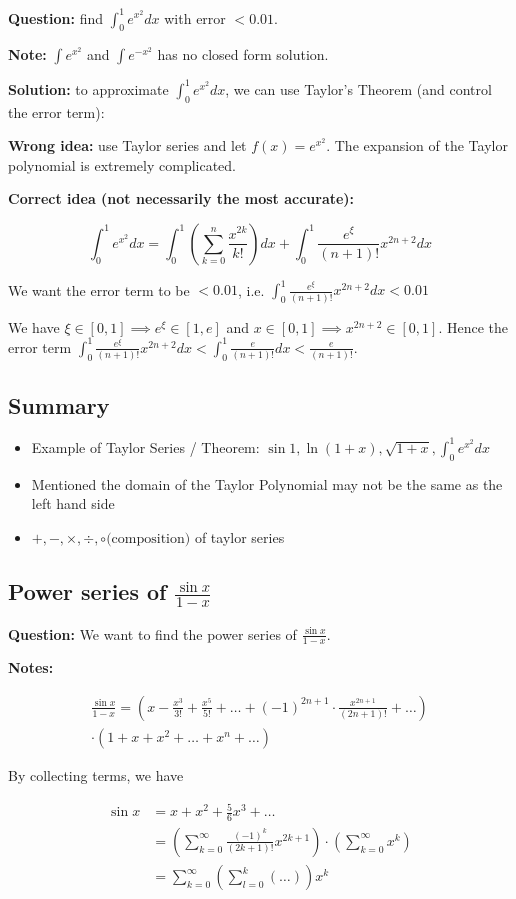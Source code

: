 \textbf{Question:} find $\int_0^1 e^{x^2} dx$ with error $< 0.01$.

\textbf{Note:} $\int e^{x^2}$ and $\int e^{-x^2}$ has no closed form solution.

\textbf{Solution:} to approximate $ \int_0^1 e^{x^2} dx $, we can use Taylor's Theorem (and control the error term):

\textbf{Wrong idea:} use Taylor series and let $f(x) = e^{x^2}$. The expansion of the Taylor polynomial is extremely complicated.

\textbf{Correct idea (not necessarily the most accurate):}

$$ \int_0^1 e^{x^2} dx = \int_0^1 (\sum_{k=0}^n \frac{x^{2k}}{k!}) dx + \int_0^1 \frac{e^\xi}{(n+1)!} x^{2n+2} dx $$

We want the error term to be $< 0.01$, i.e. $ \int_{0}^1 \frac{e^\xi}{(n+1)!} x^{2n+2} dx < 0.01 $

We have $ \xi \in [0, 1] \implies e^\xi \in [1, e] $ and $ x \in [0, 1] \implies x^{2n+2} \in [0, 1] $. Hence the error term $ \int_{0}^1 \frac{e^\xi}{(n+1)!} x^{2n+2} dx < \int_0^1 \frac{e}{(n+1)!} dx < \frac{e}{(n+1)!} $.

\subsection{Summary}

\begin{itemize}
  \item Example of Taylor Series / Theorem: $\sin 1, \ln (1 + x), \sqrt{1 + x}, \int_0^1 e^{x^2} dx$
  \item Mentioned the domain of the Taylor Polynomial may not be the same as the left hand side
  \item $+, -, \times, \div, \circ \text{(composition)}$ of taylor series
\end{itemize}

\subsection{Power series of $ \frac{\sin x}{1 - x} $}

\textbf{Question:} We want to find the power series of $ \frac{\sin x}{1 - x} $.

\textbf{Notes:} 

\begin{equation*}
\begin{split}
\frac{\sin x}{1 - x} = 
  (x - \frac{x^3}{3!} + \frac{x^5}{5!} + \dots + (-1)^{2n+1} \cdot \frac{x^{2n+1}}{(2n+1)!} + \dots) \\ 
  \cdot (1 + x + x^2 + \dots + x^n + \dots)
\end{split}
\end{equation*}

By collecting terms, we have

\begin{equation*}
\begin{split}
\sin x 
& = x + x^2 + \frac{5}{6} x^3 + \dots\\
& = (\sum_{k=0}^\infty \frac{(-1)^k}{(2k+1)!} x^{2k+1}) \cdot (\sum_{k=0}^\infty x^k)\\
& = \sum_{k=0}^\infty (\sum_{l=0}^k (\dots)) x^k
\end{split}
\end{equation*}